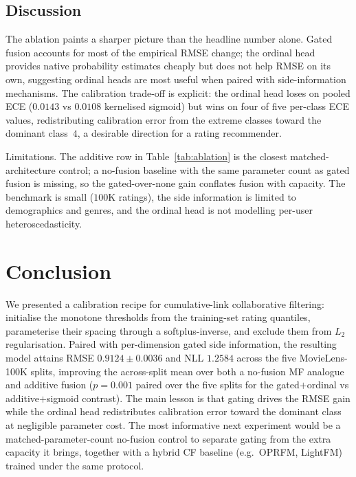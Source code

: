 \documentclass[a4paper]{article} %
\begin{document}
\subsection{Discussion}
The ablation paints a sharper picture than the headline number alone. Gated
fusion accounts for most of the empirical RMSE change; the ordinal head provides
native probability estimates cheaply but does not help RMSE on its own,
suggesting ordinal heads are most useful when paired with side-information
mechanisms. The calibration trade-off is explicit: the ordinal head loses on
pooled ECE ($0.0143$ vs $0.0108$ kernelised sigmoid) but wins on four of five
per-class ECE values, redistributing calibration error from the extreme
classes toward the dominant class~$4$, a desirable direction for a rating
recommender.

Limitations. The additive row in Table~\ref{tab:ablation} is the closest
matched-architecture control; a no-fusion baseline with the same parameter
count as gated fusion is missing, so the gated-over-none gain conflates fusion
with capacity. The benchmark is small ($100$K ratings), the side information
is limited to demographics and genres, and the ordinal head is not modelling
per-user heteroscedasticity.

\section{Conclusion}
\label{sec:conclusion}
We presented a calibration recipe for cumulative-link collaborative filtering:
initialise the monotone thresholds from the training-set rating quantiles,
parameterise their spacing through a softplus-inverse, and exclude them from
$L_2$ regularisation. Paired with per-dimension gated side information, the
resulting model attains RMSE $0.9124\pm0.0036$ and NLL $1.2584$ across the five
MovieLens-100K splits, improving the across-split mean over both a no-fusion MF
analogue and additive fusion ($p=0.001$ paired over the five splits for the
gated$+$ordinal vs additive$+$sigmoid contrast). The main lesson is that gating
drives the RMSE gain while the ordinal head redistributes calibration error
toward the dominant class at negligible parameter cost. The most informative
next experiment would be a matched-parameter-count no-fusion control to
separate gating from the extra capacity it brings, together with a hybrid CF
baseline (e.g.\ OPRFM, LightFM) trained under the same protocol.



\end{document}
